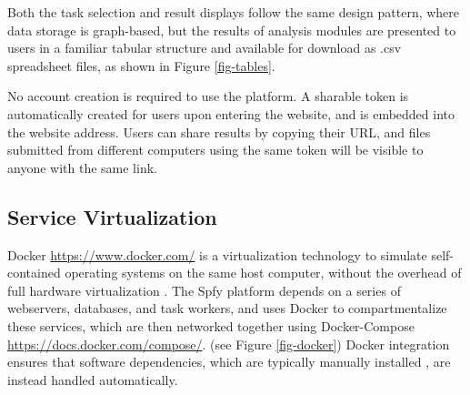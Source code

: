 \documentclass{article}
\begin{document}
Both the task selection and result displays follow the same design pattern, where data storage is graph-based, but the results of analysis modules are presented to users in a familiar tabular structure and available for download as .csv spreadsheet files, as shown in Figure \ref{fig-tables}.

No account creation is required to use the platform. A sharable token is automatically created for users upon entering the website, and is embedded into the website address. Users can share results by copying their URL, and files submitted from different computers using the same token will be visible to anyone with the same link.

\subsection{Service Virtualization}



Docker \url{https://www.docker.com/} is a virtualization technology to simulate self-contained operating systems on the same host computer, without the overhead of full hardware virtualization \cite{felter2015updated}.
The Spfy platform depends on a series of webservers, databases, and task workers, and uses Docker to compartmentalize these services, which are then networked together using Docker-Compose \url{https://docs.docker.com/compose/}.
(see Figure \ref{fig-docker})
Docker integration ensures that software dependencies, which are typically manually installed \cite{doi:10.1093/bioinformatics/btu153,laing2010pan,inouye2014srst2,naccache2014cloud}, are instead handled automatically.
\end{document}
